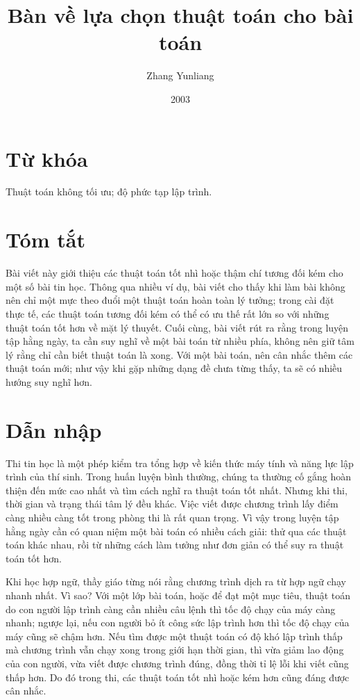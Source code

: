 \documentclass[11pt]{article}
\title{Bàn về lựa chọn thuật toán cho bài toán}
\author{Zhang Yunliang}
\date{2003}
\begin{document}
\maketitle


\section*{Từ khóa}

Thuật toán không tối ưu; độ phức tạp lập trình.

\section*{Tóm tắt}

Bài viết này giới thiệu các thuật toán tốt nhì hoặc thậm chí tương đối kém
cho một số bài tin học. Thông qua nhiều ví dụ, bài viết cho thấy khi làm bài
không nên chỉ một mực theo đuổi một thuật toán hoàn toàn lý tưởng; trong cài
đặt thực tế, các thuật toán tương đối kém có thể có ưu thế rất lớn so với
những thuật toán tốt hơn về mặt lý thuyết. Cuối cùng, bài viết rút ra rằng
trong luyện tập hằng ngày, ta cần suy nghĩ về một bài toán từ nhiều phía,
không nên giữ tâm lý rằng chỉ cần biết thuật toán là xong. Với một bài toán,
nên cân nhắc thêm các thuật toán mới; như vậy khi gặp những dạng đề chưa từng
thấy, ta sẽ có nhiều hướng suy nghĩ hơn.

\section{Dẫn nhập}

Thi tin học là một phép kiểm tra tổng hợp về kiến thức máy tính và năng lực
lập trình của thí sinh. Trong huấn luyện bình thường, chúng ta thường cố gắng
hoàn thiện đến mức cao nhất và tìm cách nghĩ ra thuật toán tốt nhất. Nhưng khi
thi, thời gian và trạng thái tâm lý đều khác. Việc viết được chương trình lấy
điểm càng nhiều càng tốt trong phòng thi là rất quan trọng. Vì vậy trong luyện
tập hằng ngày cần có quan niệm một bài toán có nhiều cách giải: thử qua các
thuật toán khác nhau, rồi từ những cách làm tưởng như đơn giản có thể suy ra
thuật toán tốt hơn.

Khi học hợp ngữ, thầy giáo từng nói rằng chương trình dịch ra từ hợp ngữ chạy
nhanh nhất. Vì sao? Với một lớp bài toán, hoặc để đạt một mục tiêu, thuật toán
do con người lập trình càng cần nhiều câu lệnh thì tốc độ chạy của máy càng
nhanh; ngược lại, nếu con người bỏ ít công sức lập trình hơn thì tốc độ chạy
của máy cũng sẽ chậm hơn. Nếu tìm được một thuật toán có độ khó lập trình thấp
mà chương trình vẫn chạy xong trong giới hạn thời gian, thì vừa giảm lao động
của con người, vừa viết được chương trình đúng, đồng thời tỉ lệ lỗi khi viết
cũng thấp hơn. Do đó trong thi, các thuật toán tốt nhì hoặc kém hơn cũng đáng
được cân nhắc.
\end{document}
